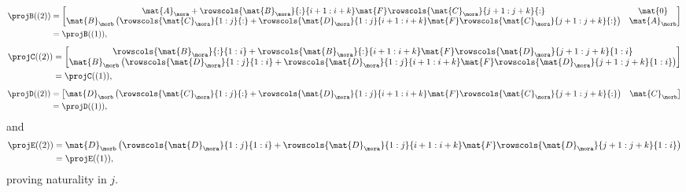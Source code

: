 {\begin{example}
\begin{equation*}
            \begin{aligned}
                \projB((2)) & =\begin{bmatrix}
                                   \mat{A}_\mora + \rowscols{\mat{B}_\mora}{:}{i+1:i+k}\mat{F}\rowscols{\mat{C}_\mora}{j+1:j+k}{:}                                                   & \mat{0}       \\
                                   \mat{B}_\morb \left( \rowscols{\mat{C}_\mora}{1:j}{:}+ \rowscols{\mat{D}_\mora}{1:j}{i+1:i+k} \mat{F} \rowscols{\mat{C}_\mora}{j+1:j+k}{:}\right) & \mat{A}_\morb
                               \end{bmatrix} \\
                            & =\projB((1)),
            \end{aligned}
        \end{equation*}
        \begin{equation*}
            \begin{aligned}
                \projC((2)) & =\begin{bmatrix} \rowscols{\mat{B}_\mora}{:}{1:i}+\rowscols{\mat{B}_\mora}{:}{i+1:i+k}\mat{F}\rowscols{\mat{D}_\mora}{j+1:j+k}{1:i} \\ \mat{B}_\morb \left( \rowscols{\mat{D}_\mora}{1:j}{1:i}+ \rowscols{\mat{D}_\mora}{1:j}{i+1:i+k}\mat{F}\rowscols{\mat{D}_\mora}{j+1:j+k}{1:i}\right)\end{bmatrix} \\
                            & =\projC((1)),
            \end{aligned}
        \end{equation*}
        \begin{equation*}
            \begin{aligned}
                \projD((2)) & =\begin{bmatrix}\mat{D}_\morb \left(\rowscols{\mat{C}_\mora}{1:j}{:}+ \rowscols{\mat{D}_\mora}{1:j}{i+1:i+k} \mat{F} \rowscols{\mat{C}_\mora}{j+1:j+k}{:}\right)&\mat{C}_\morb \end{bmatrix} \\
                            & =\projD((1)),
            \end{aligned}
        \end{equation*}
        and
        \begin{equation*}
            \begin{aligned}
                \projE((2)) & =\mat{D}_\morb\left(\rowscols{\mat{D}_\mora}{1:j}{1:i}+ \rowscols{\mat{D}_\mora}{1:j}{i+1:i+k}\mat{F}\rowscols{\mat{D}_\mora}{j+1:j+k}{1:i} \right) \\
                            & =\projE((1)),
            \end{aligned}
        \end{equation*}
        proving naturality in $j$.


\end{example}}
